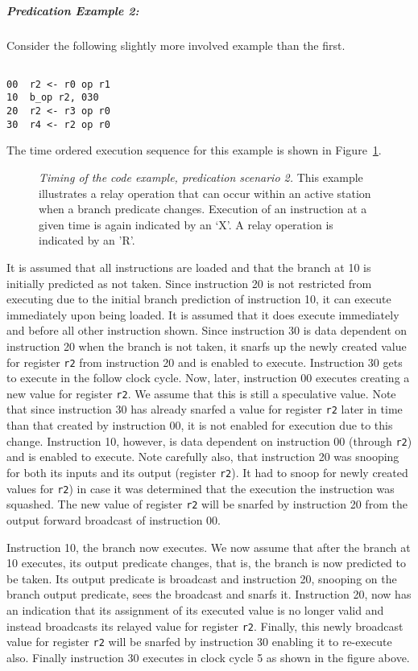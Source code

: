 \subparagraph{Predication Example 2: }
Consider the following slightly more involved example than the first.

\begin{verbatim}

00	r2 <- r0 op r1
10	b_op r2, 030
20	r2 <- r3 op r0
30	r4 <- r2 op r0

\end{verbatim}

The time ordered execution sequence for this example is shown in
Figure~\ref{pex2}.

\begin{figure}
\centering
{}
\caption{{\em Timing of the code example, predication scenario 2.}
This example illustrates a relay operation that
can occur within an active station when a branch
predicate changes.
Execution of an instruction at a given time is
again indicated by an `X'.  A relay operation is indicated by an 'R'.}
\label{pex2}
\end{figure}

It is assumed that all instructions are loaded and that
the branch at 10 is initially predicted as not taken.
Since instruction 20 is not restricted from executing
due to the initial branch prediction of instruction 10,
it can execute immediately upon being loaded.
It is assumed that it does execute immediately and before
all other instruction shown.
Since instruction 30 is data dependent on instruction 20
when the branch is not taken, it snarfs up the
newly created value for register
{\tt r2}
from instruction 20 and is enabled to execute.
Instruction 30 gets to execute in the follow clock cycle.
Now, later, instruction 00 executes creating a new value for
register
{\tt r2}.
We assume that this is still a speculative value.
Note that since instruction 30 has already snarfed a value for
register
{\tt r2}
later in time than that created by instruction 00, it is not
enabled for execution due to this change.
Instruction 10, however, is data dependent on instruction 00 (through
{\tt r2})
and is enabled to execute.  
Note carefully also, that instruction 20 was snooping for both
its inputs and its output (register
{\tt r2}).  It had to snoop for newly created values for
{\tt r2}) in case it was determined that the execution the instruction
was squashed.  The new value of
register
{\tt r2} will be snarfed by instruction 20 from 
the output forward broadcast of
instruction 00.

Instruction 10, the branch now executes.
We now assume that after the branch at 10 executes, its output
predicate changes, that is, the branch is now predicted to
be taken.  Its output predicate is broadcast and
instruction 20, snooping on the branch output predicate,
sees the broadcast and snarfs it.  Instruction 20, now has
an indication that its assignment of its executed value
is no longer valid and instead broadcasts its relayed value
for register
{\tt r2}.
Finally, this newly broadcast value for
register
{\tt r2} will
be snarfed by instruction 30 enabling it to re-execute also.
Finally instruction 30 executes in clock cycle 5 as shown in the
figure above.

